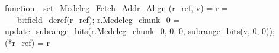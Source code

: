 function _set_Medeleg_Fetch_Addr_Align (r_ref, v) = {
    r = __bitfield_deref(r_ref);
    r.Medeleg_chunk_0 = update_subrange_bits(r.Medeleg_chunk_0, 0, 0, subrange_bits(v, 0, 0));
    (*r_ref) = r
}
